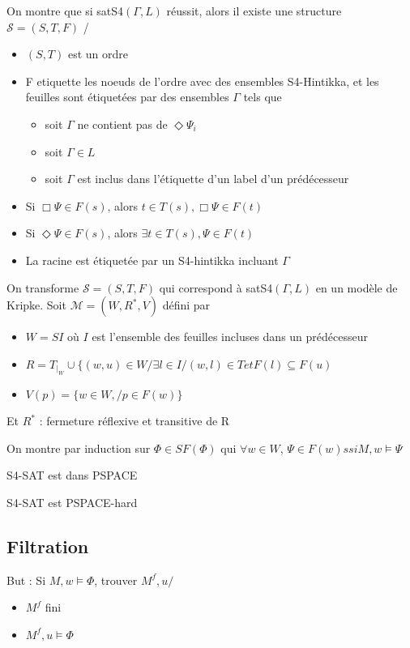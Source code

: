 \documentclass[10pt,a4paper]{article}
\begin{document}
\begin{dem}{}
  On montre que si  satS4$(\Gamma, L)$ réussit, alors il existe une structure $\mathcal{S} = (S, T, F)$ /
\begin{itemize}
 \item $(S,T)$ est un ordre
 \item F etiquette les noeuds de l'ordre avec des ensembles S4-Hintikka, et les feuilles sont étiquetées par des ensembles $\Gamma$ tels que
\begin{itemize}
 \item soit $\Gamma$ ne contient pas de $\Diamond \Psi_i$
 \item soit $\Gamma \in L$
 \item soit $\Gamma$ est inclus dans l'étiquette d'un label d'un prédécesseur
\end{itemize}
\item Si $\Box \Psi \in F(s)$, alors $t \in T(s), \Box \Psi \in F(t)$
\item Si $\Diamond \Psi \in F(s)$, alors $\exists t \in T(s),  \Psi \in F(t)$
\item La racine est étiquetée par un S4-hintikka incluant $\Gamma$
\end{itemize}

 On transforme $\mathcal{S} = (S, T, F)$ qui correspond à satS4$(\Gamma, L)$ en un modèle de Kripke.
Soit $\mathcal{M} = (W, R^*, V)$ défini par 
\begin{itemize}
 \item $W = S I$ où $I$ est l'ensemble des feuilles incluses dans un prédécesseur
 \item $R = T_{|_W} \cup \{ (w,u) \in W / \exists l \in I / (w,l) \in T et F(l) \subseteq F(u)$
 \item $V(p) =  \{w \in W, / p \in F(w) \}$
\end{itemize}
Et $R^*$ : fermeture réflexive et transitive de R

On montre par induction sur $\Phi \in SF(\Phi)$ qui $\forall w \in W$, 
$\Psi \in F(w) ssi M,w \models \Psi$
\end{dem}

\begin{thm}{}
 S4-SAT est dans PSPACE
\end{thm}
\begin{thm}{}
 S4-SAT est PSPACE-hard
\end{thm}

\subsection{Filtration} 
But : Si $M, w \models \Phi$, trouver $M^f, u / $
\begin{itemize}
 \item $M^f$ fini
 \item $M^f, u \models \Phi$
\end{itemize}
\end{document}
